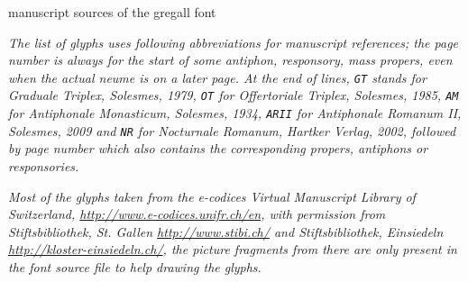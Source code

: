 \documentclass[a4paper]{article}
\begin{document}
\begin{center}
\huge{manuscript sources of the gregall font}
\end{center}

\textit{The list of glyphs uses following abbreviations for manuscript
references; the page number is always for the start of some antiphon,
responsory, mass propers, even when the actual neume is on a later page.
At the end of lines, \texttt{GT} stands for Graduale Triplex, Solesmes,
1979, \texttt{OT} for Offertoriale Triplex, Solesmes, 1985, \texttt{AM}
for Antiphonale Monasticum, Solesmes, 1934, \texttt{ARII} for Antiphonale
Romanum II, Solesmes, 2009 and \texttt{NR} for Nocturnale Romanum, Hartker
Verlag, 2002, followed by page number which also contains the corresponding
propers, antiphons or responsories.}

\textit{Most of the glyphs taken from the e-codices Virtual Manuscript Library
of Switzerland, \url{http://www.e-codices.unifr.ch/en}, with permission
from Stiftsbibliothek, St. Gallen \url{http://www.stibi.ch/} and
Stiftsbibliothek, Einsiedeln\\
\url{http://kloster-einsiedeln.ch/}, the picture fragments from there are
only present in the font source file to help drawing the glyphs.}
\end{document}
